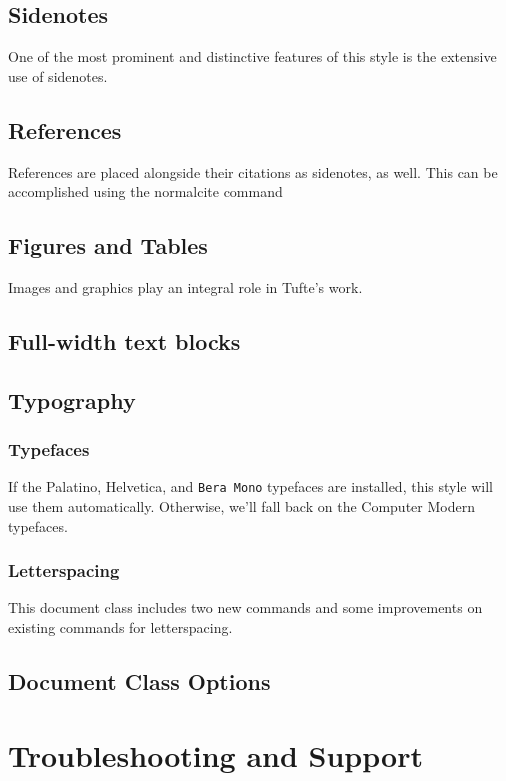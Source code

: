 \documentclass{tufte-book}
\begin{document}
\section{Sidenotes}\label{sec:sidenotes}
One of the most prominent and distinctive features of this style is the
extensive use of sidenotes.

\section{References}
References are placed alongside their citations as sidenotes,
as well.  This can be accomplished using the normalcite command

\section{Figures and Tables}\label{sec:figures-and-tables}
Images and graphics play an integral role in Tufte's work.

\section{Full-width text blocks}

\section{Typography}\label{sec:typography}

\subsection{Typefaces}\label{sec:typefaces}
If the Palatino, \textsf{Helvetica}, and \texttt{Bera Mono} typefaces are installed, this style
will use them automatically.  Otherwise, we'll fall back on the Computer Modern
typefaces.

\subsection{Letterspacing}\label{sec:letterspacing}
This document class includes two new commands and some improvements on
existing commands for letterspacing.

\section{Document Class Options}\label{sec:options}

\chapter{Troubleshooting and Support}
\label{ch:troubleshooting}
\end{document}
